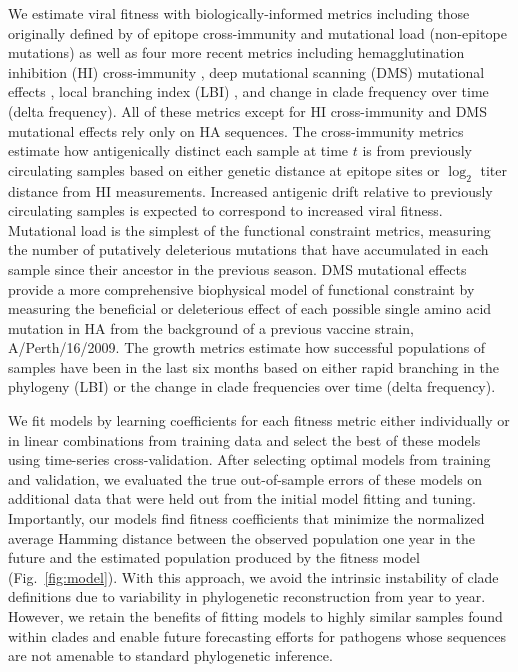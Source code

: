We estimate viral fitness with biologically-informed metrics including those originally defined by \cite{Luksza:2014hj} of epitope cross-immunity and mutational load (non-epitope mutations) as well as four more recent metrics including hemagglutination inhibition (HI) cross-immunity \cite{Neher:2016hy}, deep mutational scanning (DMS) mutational effects \cite{Lee2018}, local branching index (LBI) \cite{Neher:2014eu}, and change in clade frequency over time (delta frequency).
All of these metrics except for HI cross-immunity and DMS mutational effects rely only on HA sequences.
The cross-immunity metrics estimate how antigenically distinct each sample at time $t$ is from previously circulating samples based on either genetic distance at epitope sites or $\log_{2}$ titer distance from HI measurements.
Increased antigenic drift relative to previously circulating samples is expected to correspond to increased viral fitness.
Mutational load is the simplest of the functional constraint metrics, measuring the number of putatively deleterious mutations that have accumulated in each sample since their ancestor in the previous season.
DMS mutational effects provide a more comprehensive biophysical model of functional constraint by measuring the beneficial or deleterious effect of each possible single amino acid mutation in HA from the background of a previous vaccine strain, A/Perth/16/2009.
The growth metrics estimate how successful populations of samples have been in the last six months based on either rapid branching in the phylogeny (LBI) or the change in clade frequencies over time (delta frequency).

We fit models by learning coefficients for each fitness metric either individually or in linear combinations from training data and select the best of these models using time-series cross-validation.
After selecting optimal models from training and validation, we evaluated the true out-of-sample errors of these models on additional data that were held out from the initial model fitting and tuning.
Importantly, our models find fitness coefficients that minimize the normalized average Hamming distance between the observed population one year in the future and the estimated population produced by the fitness model (Fig.~\ref{fig:model}).
With this approach, we avoid the intrinsic instability of clade definitions due to variability in phylogenetic reconstruction from year to year.
However, we retain the benefits of fitting models to highly similar samples found within clades and enable future forecasting efforts for pathogens whose sequences are not amenable to standard phylogenetic inference.

